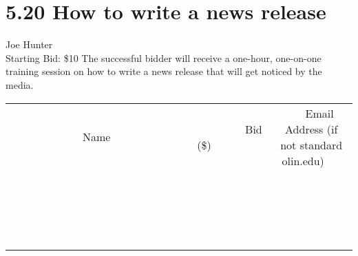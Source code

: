 \documentclass[11pt]{article}
\begin{document}
\section*{5.20 How to write a news release}
Joe Hunter
\\
Starting Bid: \$10
\newline
The successful bidder will receive a one-hour, one-on-one training session on how to write a news release that will get noticed by the media.
\\[3ex]
\begin{tabular}{c c c}
~~~~~~~~~~~~~Name~~~~~~~~~~~~~ & ~~~~~~~~~Bid (\$)~~~~~~~~~  & ~~~Email Address (if not standard olin.edu)~~~\\
 & & \\
\hline
 & & \\
\hline
 & & \\
\hline
 & & \\
\hline
 & & \\
\hline
 & & \\
\hline
 & & \\
\hline
 & & \\
\hline
 & & \\
\hline
 & & \\
\hline
 & & \\
\hline
 & & \\
\hline
 & & \\
\hline
 & & \\
\hline
 & & \\
\hline
 & & \\
\hline
 & & \\
\hline
 & & \\
\hline
 & & \\
\hline
\end{tabular}
\newpage
\end{document}
